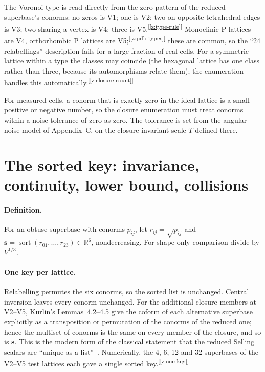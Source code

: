 \documentclass[11pt]{article}
\newcommand{\sortkey}{\mathbf{s}}
\newcommand{\chk}[1]{\textsuperscript{[\ref{#1}]}}
\begin{document}
The Voronoi type is read directly from the zero pattern of the reduced superbase's conorms: no zeros is V1; one is V2; two on opposite tetrahedral edges is V3; two sharing a vertex is V4; three is V5.\chk{z:type-rule} Monoclinic P lattices are V4, orthorhombic P lattices are V5;\chk{z:pdb-types} these are common, so the ``24 relabellings'' description fails for a large fraction of real cells. For a symmetric lattice within a type the classes may coincide (the hexagonal lattice has one class rather than three, because its automorphisms relate them); the enumeration handles this automatically.\chk{z:closure-count}

For measured cells, a conorm that is exactly zero in the ideal lattice is a small positive or negative number, so the closure enumeration must treat conorms within a noise tolerance of zero as zero. The tolerance is set from the angular noise model of Appendix~C, on the closure-invariant scale $T$ defined there.

\section{The sorted key: invariance, continuity, lower bound, collisions}
\label{app:key}

\paragraph{Definition.}
For an obtuse superbase with conorms $p_{ij}$, let $r_{ij}=\sqrt{p_{ij}}$ and $\sortkey=\operatorname{sort}(r_{01},\dots,r_{23})\in\mathbb R^6$, nondecreasing. For shape-only comparison divide by $V^{1/3}$.

\paragraph{One key per lattice.}
Relabelling permutes the six conorms, so the sorted list is unchanged. Central inversion leaves every conorm unchanged. For the additional closure members at V2--V5, Kurlin's Lemmas~4.2--4.5 give the coform of each alternative superbase explicitly as a transposition or permutation of the conorms of the reduced one; hence the multiset of conorms is the same on every member of the closure, and so is $\sortkey$. This is the modern form of the classical statement that the reduced Selling scalars are ``unique as a list''~\cite{bravais1850,delone1932,abs2019}. Numerically, the 4, 6, 12 and 32 superbases of the V2--V5 test lattices each gave a single sorted key.\chk{z:one-key}
\end{document}
